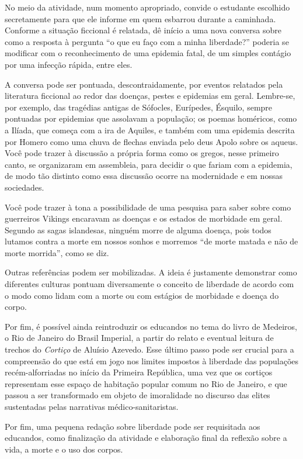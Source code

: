 \documentclass[12pt]{extarticle}
\begin{document}
No meio da atividade, num momento apropriado, convide o estudante
escolhido secretamente para que ele informe em quem esbarrou durante a
caminhada. Conforme a situação ficcional é relatada, dê início a uma
nova conversa sobre como a resposta à pergunta ``o que eu faço com a
minha liberdade?'' poderia se modificar com o reconhecimento de uma
epidemia fatal, de um simples contágio por uma infecção rápida, entre
eles.

A conversa pode ser pontuada, descontraidamente, por eventos relatados
pela literatura ficcional ao redor das doenças, pestes e epidemias em
geral. Lembre-se, por exemplo, das tragédias antigas de Sófocles,
Eurípedes, Ésquilo, sempre pontuadas por epidemias que assolavam a
população; os poemas homéricos, como a Ilíada, que começa com a ira de
Aquiles, e também com uma epidemia descrita por Homero como uma chuva de
flechas enviada pelo deus Apolo sobre os aqueus. Você pode trazer à
discussão a própria forma como os gregos, nesse primeiro canto, se
organizaram em assembleia, para decidir o que fariam com a epidemia, de
modo tão distinto como essa discussão ocorre na modernidade e em nossas
sociedades.

Você pode trazer à tona a possibilidade de uma pesquisa para saber sobre
como guerreiros Vikings encaravam as doenças e os estados de morbidade
em geral. Segundo as sagas islandesas, ninguém morre de alguma doença,
pois todos lutamos contra a morte em nossos sonhos e morremos ``de morte
matada e não de morte morrida'', como se diz.

Outras referências podem ser mobilizadas. A ideia é justamente
demonstrar como diferentes culturas pontuam diversamente o conceito de
liberdade de acordo com o modo como lidam com a morte ou com estágios de
morbidade e doença do corpo.

Por fim, é possível ainda reintroduzir os educandos no tema do livro de
Medeiros, o Rio de Janeiro do Brasil Imperial, a partir do relato e
eventual leitura de trechos do \emph{Cortiço} de Aluísio Azevedo. Esse
último passo pode ser crucial para a compreensão do que está em jogo nos
limites impostos à liberdade das populações recém-alforriadas no início
da Primeira República, uma vez que os cortiços representam esse espaço
de habitação popular comum no Rio de Janeiro, e que passou a ser
transformado em objeto de imoralidade no discurso das elites sustentadas
pelas narrativas médico-sanitaristas.

Por fim, uma pequena redação sobre liberdade pode ser requisitada aos
educandos, como finalização da atividade e elaboração final da reflexão
sobre a vida, a morte e o uso dos corpos.
\end{document}
